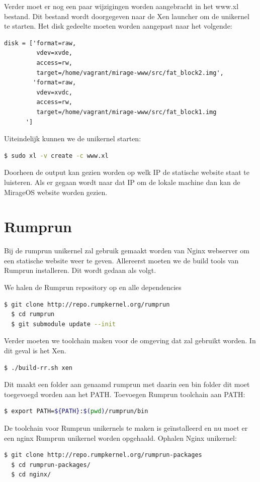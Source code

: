 \documentclass[pdftex,a4paper,12pt,twoside]{report}
\begin{document}
Verder moet er nog een paar wijzigingen worden aangebracht in het www.xl bestand. Dit bestand wordt doorgegeven naar de Xen launcher om de unikernel te starten.
\noindent Het disk gedeelte moeten worden aangepast naar het volgende:
\begin{lstlisting}
disk = ['format=raw,
         vdev=xvde,
         access=rw,
         target=/home/vagrant/mirage-www/src/fat_block2.img',
        'format=raw,
         vdev=xvdc,
         access=rw,
         target=/home/vagrant/mirage-www/src/fat_block1.img
      ']
\end{lstlisting}


\noindent Uiteindelijk kunnen we de unikernel starten:
\begin{lstlisting}[language=bash]
  $ sudo xl -v create -c www.xl
\end{lstlisting}

Doorheen de output kan gezien worden op welk IP de statische website staat te luisteren. Als er gegaan wordt naar dat IP om de lokale machine dan kan de MirageOS website worden gezien.

\section{Rumprun}

Bij de rumprun unikernel zal gebruik gemaakt worden van Nginx webserver om een statische website weer te geven. 
Allereerst moeten we de build tools van Rumprun installeren.
Dit wordt gedaan als volgt.

\noindent We halen de Rumprun repository op en alle dependencies
\begin{lstlisting}[language=bash]
  $ git clone http://repo.rumpkernel.org/rumprun
  $ cd rumprun
  $ git submodule update --init
\end{lstlisting}

Verder moeten we toolchain maken voor de omgeving dat zal gebruikt worden. In dit geval is het Xen.
\begin{lstlisting}[language=bash]
  $ ./build-rr.sh xen
\end{lstlisting}

Dit maakt een folder aan genaamd rumprun met daarin een bin folder dit moet toegevoegd worden aan het PATH.
\noindent Toevoegen Rumprun toolchain aan PATH:
\begin{lstlisting}[language=bash]
  $ export PATH=${PATH}:$(pwd)/rumprun/bin
\end{lstlisting}

De toolchain voor Rumprun unikernels te maken is geïnstalleerd en nu moet er een nginx Rumprun unikernel worden opgehaald.
\noindent Ophalen Nginx unikernel:
\begin{lstlisting}[language=bash]
  $ git clone http://repo.rumpkernel.org/rumprun-packages
  $ cd rumprun-packages/
  $ cd nginx/
\end{lstlisting}
\end{document}
